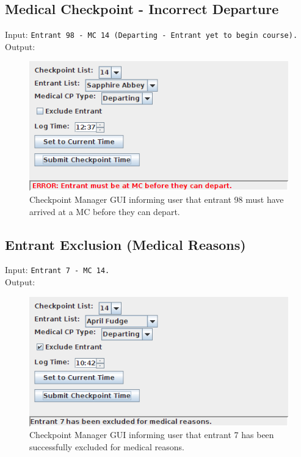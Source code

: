 \documentclass[a4paper, 10pt]{article}
\begin{document}
\clearpage
\subsection{Medical Checkpoint - Incorrect Departure}

Input: \verb+Entrant 98 - MC 14 (Departing - Entrant yet to begin course).+ \\

Output:
\begin{figure}[ht!]
\centering
\includegraphics[scale=0.7]{cm-mcdepartfailure.png}
\caption{Checkpoint Manager GUI informing user that entrant 98 must have arrived at a MC before they can depart.}
\end{figure}

\subsection{Entrant Exclusion (Medical Reasons)}

Input: \verb+Entrant 7 - MC 14.+ \\

Output:
\begin{figure}[ht!]
\centering
\includegraphics[scale=0.7]{cm-mcexclude.png}
\caption{Checkpoint Manager GUI informing user that entrant 7 has been successfully excluded for medical reasons.}
\end{figure}
\end{document}
